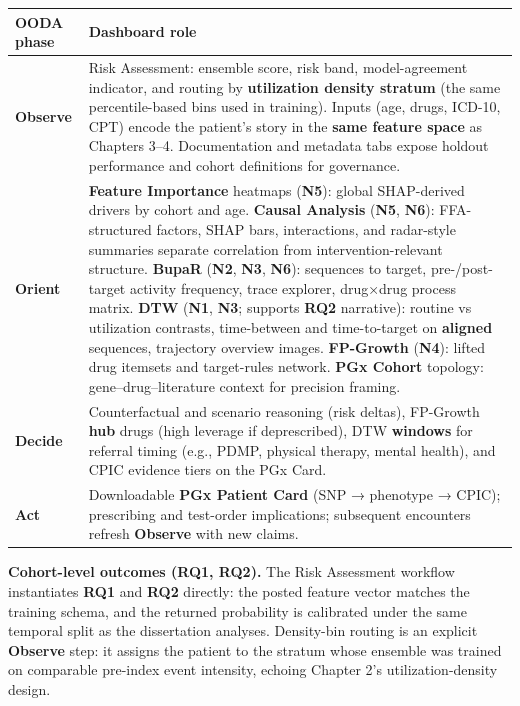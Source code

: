 \documentclass[
  12pt,
]{book}
\begin{document}
\begin{longtable}[]{@{}
  >{\raggedright\arraybackslash}p{}
  >{\raggedright\arraybackslash}p{}@{}}
\toprule\noalign{}
\begin{minipage}[b]{\linewidth}\raggedright
OODA phase
\end{minipage} & \begin{minipage}[b]{\linewidth}\raggedright
Dashboard role
\end{minipage} \\
\midrule\noalign{}
\endhead
\bottomrule\noalign{}
\endlastfoot
\textbf{Observe} & Risk Assessment: ensemble score, risk band,
model-agreement indicator, and routing by \textbf{utilization density
stratum} (the same percentile-based bins used in training). Inputs (age,
drugs, ICD-10, CPT) encode the patient's story in the \textbf{same
feature space} as Chapters 3--4. Documentation and metadata tabs expose
holdout performance and cohort definitions for governance. \\
\textbf{Orient} & \textbf{Feature Importance} heatmaps (\textbf{N5}):
global SHAP-derived drivers by cohort and age. \textbf{Causal Analysis}
(\textbf{N5}, \textbf{N6}): FFA-structured factors, SHAP bars,
interactions, and radar-style summaries separate correlation from
intervention-relevant structure. \textbf{BupaR} (\textbf{N2},
\textbf{N3}, \textbf{N6}): sequences to target, pre-/post-target
activity frequency, trace explorer, drug×drug process matrix.
\textbf{DTW} (\textbf{N1}, \textbf{N3}; supports \textbf{RQ2}
narrative): routine vs utilization contrasts, time-between and
time-to-target on \textbf{aligned} sequences, trajectory overview
images. \textbf{FP-Growth} (\textbf{N4}): lifted drug itemsets and
target-rules network. \textbf{PGx Cohort} topology:
gene--drug--literature context for precision framing. \\
\textbf{Decide} & Counterfactual and scenario reasoning (risk deltas),
FP-Growth \textbf{hub} drugs (high leverage if deprescribed), DTW
\textbf{windows} for referral timing (e.g., PDMP, physical therapy,
mental health), and CPIC evidence tiers on the PGx Card. \\
\textbf{Act} & Downloadable \textbf{PGx Patient Card} (SNP → phenotype →
CPIC); prescribing and test-order implications; subsequent encounters
refresh \textbf{Observe} with new claims. \\
\end{longtable}

\textbf{Cohort-level outcomes (RQ1, RQ2).} The Risk Assessment workflow
instantiates \textbf{RQ1} and \textbf{RQ2} directly: the posted feature
vector matches the training schema, and the returned probability is
calibrated under the same temporal split as the dissertation analyses.
Density-bin routing is an explicit \textbf{Observe} step: it assigns the
patient to the stratum whose ensemble was trained on comparable
pre-index event intensity, echoing Chapter 2's utilization-density
design.
\end{document}
